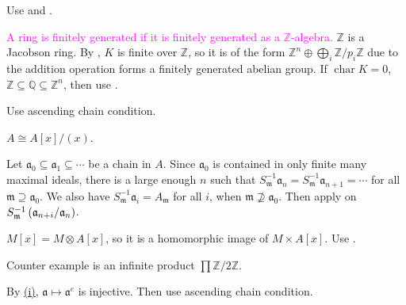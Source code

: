 \begin{exercise}\label{ex7.5}
	Use  and .
\end{exercise}

\begin{exercise}\label{ex7.6}
	\textcolor{magenta}{A ring is finitely generated if it is finitely generated as a $\mathbb{Z}$-algebra.} $\mathbb{Z}$ is a Jacobson ring. By , $K$ is finite over $\mathbb{Z}$, so it is of the form $\mathbb{Z}^n\oplus\bigoplus_i\mathbb{Z}/p_i\mathbb{Z}$ due to the addition operation forms a finitely generated abelian group. If $\operatorname{char} K=0$, $\mathbb{Z}\subseteq\mathbb{Q}\subseteq\mathbb{Z}^n$, then use .
\end{exercise}

\begin{exercise}\label{ex7.7}
	Use ascending chain condition.
\end{exercise}

\begin{exercise}\label{ex7.8}
	$A\cong A[x]/(x)$.
\end{exercise}

\begin{exercise}\label{ex7.9}
	Let $\mathfrak{a}_0\subseteq\mathfrak{a}_1\subseteq\cdots$ be a chain in $A$. Since $\mathfrak{a}_0$ is contained in only finite many maximal ideals, there is a large enough $n$ such that $S_{\mathfrak{m}}^{-1}\mathfrak{a}_n=S_{\mathfrak{m}}^{-1}\mathfrak{a}_{n+1}=\cdots$ for all $\mathfrak{m}\supseteq\mathfrak{a}_0$. We also have $S_{\mathfrak{m}}^{-1}\mathfrak{a}_i=A_\mathfrak{m}$ for all $i$, when $\mathfrak{m}\nsupseteq\mathfrak{a}_0$. Then apply  on $S_\mathfrak{m}^{-1}\left(\mathfrak{a}_{n+i}\middle/\mathfrak{a}_n\right)$.
\end{exercise}

\begin{exercise}\label{ex7.10}
	$M[x]=M\otimes A[x]$, so it is a homomorphic image of $M\times A[x]$. Use .
\end{exercise}

\begin{exercise}\label{ex7.11}
	Counter example is an infinite product $\prod\mathbb{Z}/2\mathbb{Z}$.
\end{exercise}

\begin{exercise}\label{ex7.12}
	By \hyperref[ex3.16]{(i)}, $\mathfrak{a}\mapsto\mathfrak{a}^e$ is injective. Then use ascending chain condition.
\end{exercise}

